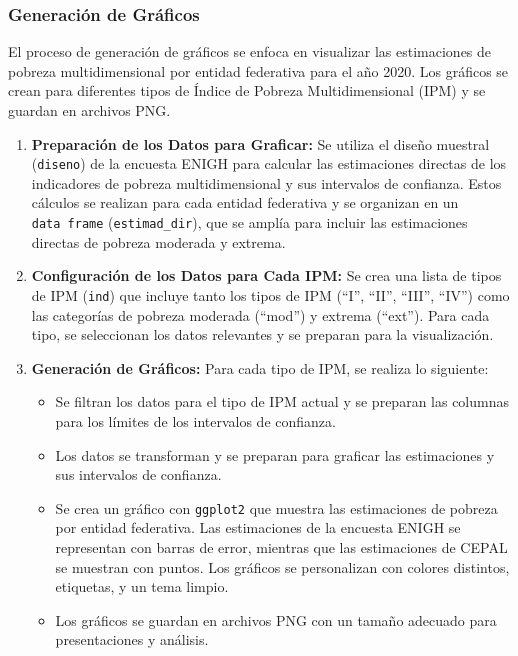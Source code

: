 \documentclass[
  12pt,
]{book}
\providecommand{\tightlist}{%
  \setlength{\itemsep}{0pt}\setlength{\parskip}{0pt}}
\begin{document}
\hypertarget{generaciuxf3n-de-gruxe1ficos}{%
\subsubsection*{Generación de Gráficos}\label{generaciuxf3n-de-gruxe1ficos}}

El proceso de generación de gráficos se enfoca en visualizar las estimaciones de pobreza multidimensional por entidad federativa para el año 2020. Los gráficos se crean para diferentes tipos de Índice de Pobreza Multidimensional (IPM) y se guardan en archivos PNG.

\begin{enumerate}
\def\labelenumi{\arabic{enumi}.}
\item
  \textbf{Preparación de los Datos para Graficar:}
  Se utiliza el diseño muestral (\texttt{diseno}) de la encuesta ENIGH para calcular las estimaciones directas de los indicadores de pobreza multidimensional y sus intervalos de confianza. Estos cálculos se realizan para cada entidad federativa y se organizan en un \texttt{data\ frame} (\texttt{estimad\_dir}), que se amplía para incluir las estimaciones directas de pobreza moderada y extrema.
\item
  \textbf{Configuración de los Datos para Cada IPM:}
  Se crea una lista de tipos de IPM (\texttt{ind}) que incluye tanto los tipos de IPM (``I'', ``II'', ``III'', ``IV'') como las categorías de pobreza moderada (``mod'') y extrema (``ext''). Para cada tipo, se seleccionan los datos relevantes y se preparan para la visualización.
\item
  \textbf{Generación de Gráficos:}
  Para cada tipo de IPM, se realiza lo siguiente:

  \begin{itemize}
  \tightlist
  \item
    Se filtran los datos para el tipo de IPM actual y se preparan las columnas para los límites de los intervalos de confianza.
  \item
    Los datos se transforman y se preparan para graficar las estimaciones y sus intervalos de confianza.
  \item
    Se crea un gráfico con \texttt{ggplot2} que muestra las estimaciones de pobreza por entidad federativa. Las estimaciones de la encuesta ENIGH se representan con barras de error, mientras que las estimaciones de CEPAL se muestran con puntos. Los gráficos se personalizan con colores distintos, etiquetas, y un tema limpio.
  \item
    Los gráficos se guardan en archivos PNG con un tamaño adecuado para presentaciones y análisis.
  \end{itemize}
\end{enumerate}
\end{document}
